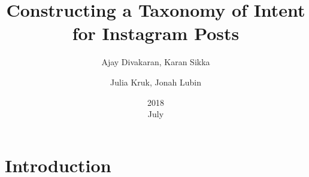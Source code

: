 \documentclass{article}
\title{Constructing a Taxonomy of Intent for Instagram Posts}
\date{2018\\ July}
\author{Ajay Divakaran, Karan Sikka 
\and Julia Kruk, Jonah Lubin}
\begin{document}
\maketitle
\section{Introduction}
\end{document}
